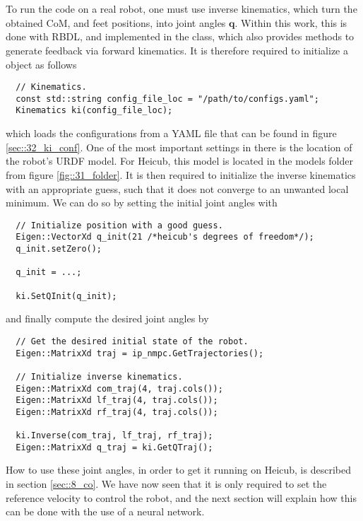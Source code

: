 \\
\\
To run the code on a real robot, one must use inverse kinematics, which turn the obtained CoM, and feet positions, into joint angles $\bm{q}$. Within this work, this is done with RBDL, and implemented in the  class, which also provides methods to generate feedback via forward kinematics. It is therefore required to initialize a  object as follows
\begin{verbatim}
  // Kinematics.
  const std::string config_file_loc = "/path/to/configs.yaml";
  Kinematics ki(config_file_loc);
\end{verbatim}
which loads the configurations from a YAML file that can be found in figure \ref{sec::32_ki_conf}. One of the most important settings in there is the location of the robot's URDF model. For Heicub, this model is located in the models folder from figure \ref{fig::31_folder}.  It is then required to initialize the inverse kinematics with an appropriate guess, such that it does not converge to an unwanted local minimum. We can do so by setting the initial joint angles with
\begin{verbatim}
  // Initialize position with a good guess.
  Eigen::VectorXd q_init(21 /*heicub's degrees of freedom*/);
  q_init.setZero();

  q_init = ...;

  ki.SetQInit(q_init);
\end{verbatim}
and finally compute the desired joint angles by
\begin{verbatim}
  // Get the desired initial state of the robot.
  Eigen::MatrixXd traj = ip_nmpc.GetTrajectories();

  // Initialize inverse kinematics.
  Eigen::MatrixXd com_traj(4, traj.cols());     
  Eigen::MatrixXd lf_traj(4, traj.cols());  
  Eigen::MatrixXd rf_traj(4, traj.cols());

  ki.Inverse(com_traj, lf_traj, rf_traj);
  Eigen::MatrixXd q_traj = ki.GetQTraj();
\end{verbatim}
How to use these joint angles, in order to get it running on Heicub, is described in section \ref{sec::8_co}. We have now seen that it is only required to set the reference velocity to control the robot, and the next section will explain how this can be done with the use of a neural network.
\\
